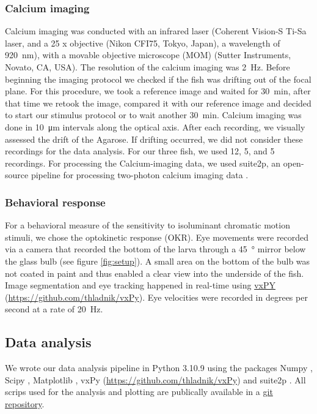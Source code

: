 \subsubsection{Calcium imaging}

Calcium imaging was conducted with an infrared laser (Coherent Vision-S Ti-Sa laser, and a 25 x objective (Nikon CFI75, Tokyo, Japan),  a wavelength of \SI{920}{\nano\meter}), with a movable objective microscope (MOM) (Sutter Instruments, Novato, CA, USA). The resolution of the calcium imaging was \SI{2}{\hertz}. Before beginning the imaging protocol we checked if the fish was drifting out of the focal plane. For this procedure, we took a reference image and waited for \SI{30}{\minute}, after that time we retook the image, compared it with our reference image and decided to start our stimulus protocol or to wait another \SI{30}{\minute}. Calcium imaging was done in \SI{10}{\micro\meter} intervals along the optical axis. After each recording, we visually assessed the drift of the Agarose. If drifting occurred, we did not consider these recordings for the data analysis. For our three fish, we used 12, 5, and 5 recordings. For processing the Calcium-imaging data, we used suite2p, an open-source pipeline for processing two-photon calcium imaging data \parencite{Pachitariu061507}.

\subsubsection{Behavioral response}

For a behavioral measure of the sensitivity to isoluminant chromatic motion stimuli, we chose the optokinetic response (OKR). 
Eye movements were recorded via a camera that recorded the bottom of the larva through a \SI{45}{\degree} mirror below the glass bulb (see figure \ref{fig:setup}). A small area on the bottom of the bulb was not coated in paint and thus enabled a clear view into the underside of the fish. Image segmentation and eye tracking happened in real-time using \href{https://github.com/thladnik/vxPy}{vxPY} (\href{https://github.com/thladnik/vxPy}{https://github.com/thladnik/vxPy}). Eye velocities were recorded in degrees per second at a rate of \SI{20}{\hertz}.  

\subsection{Data analysis}

We wrote our data analysis pipeline in Python 3.10.9 using the packages Numpy \parencite{harris2020array}, Scipy \parencite{2020SciPy-NMeth}, Matplotlib \parencite{Hunter:2007}, vxPy (\href{https://github.com/thladnik/vxPy}{https://github.com/thladnik/vxPy}) and suite2p \parencite{Pachitariu061507}. All scrips used for the analysis and plotting are publically available in a \href{https://github.com/weygoldt/colorblind-directioncells}{git repository}.

